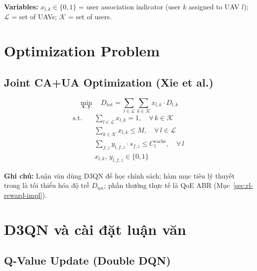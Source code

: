 \documentclass[11pt,a4paper]{article}
\begin{document}
\noindent \textbf{Variables:}
$x_{l,k} \in \{0,1\}$ = user association indicator (user $k$ assigned to UAV $l$);
$\mathcal{L}$ = set of UAVs; $\mathcal{K}$ = set of users.

\section{Optimization Problem}

\subsection{Joint CA+UA Optimization (Xie et al.)}

\begin{equation}
  \min_{\mathbf{x},\,\mathbf{y}} \quad D_{\mathrm{tot}}
    = \sum_{l \in \mathcal{L}} \sum_{k \in \mathcal{K}} x_{l,k} \cdot D_{l,k}
  \tag{Xie~P}
\end{equation}
\begin{align}
  \text{s.t.}\quad
  & \sum_{l \in \mathcal{L}} x_{l,k} = 1, \quad \forall\, k \in \mathcal{K}
    \tag{15b} \\
  & \sum_{k \in \mathcal{K}} x_{l,k} \leq M, \quad \forall\, l \in \mathcal{L}
    \tag{15c} \\
  & \sum_{f,z} y_{l,f,z} \cdot s_{f,z} \leq C_l^{\mathrm{cache}}, \quad \forall\, l
    \tag{15a} \\
  & x_{l,k},\, y_{l,f,z} \in \{0,1\}
    \tag{15d}
\end{align}

\noindent \textbf{Ghi chú:} Luận văn dùng D3QN để học chính sách; hàm mục tiêu lý thuyết
trong \cite{Xie} là tối thiểu hóa độ trễ $D_{\mathrm{tot}}$; phần thưởng thực tế là QoE ABR
(Mục~\ref{sec:rl-reward-impl}).

\section{D3QN và cài đặt luận văn}

\subsection{Q-Value Update (Double DQN)}
\end{document}
